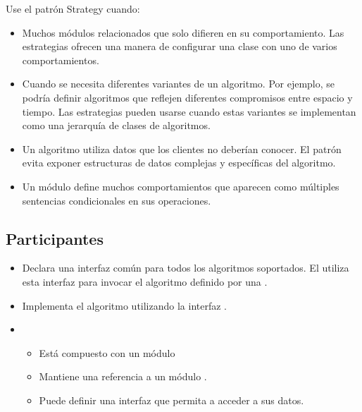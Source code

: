 Use el patrón Strategy cuando:

\begin{itemize}

\item Muchos módulos relacionados que solo difieren en su comportamiento. Las estrategias ofrecen una manera de configurar una clase con uno de varios comportamientos.

\item Cuando se necesita diferentes variantes de un algoritmo. Por ejemplo, se podría definir algoritmos que reflejen diferentes compromisos entre espacio y tiempo. Las estrategias pueden usarse cuando estas variantes se implementan como una jerarquía de clases de algoritmos.

\item Un algoritmo utiliza datos que los clientes no deberían conocer. El patrón evita exponer estructuras de datos complejas y específicas del algoritmo.

\item Un módulo define muchos comportamientos que aparecen como múltiples sentencias condicionales en sus operaciones.

\end{itemize}


\subsection*{Participantes}


\begin{itemize}
\item \Estrategia Declara una interfaz común para todos los algoritmos soportados. El \Contexto utiliza esta interfaz para invocar el algoritmo definido por una \EstrategiaConcreta.

\item \EstrategiaConcreta Implementa el algoritmo utilizando la interfaz \Estrategia.

\item  \Contexto \begin{itemize}
		\item Está compuesto con un módulo \EstrategiaConcreta
		\item Mantiene una referencia a un módulo \Estrategia.
		\item Puede definir una interfaz que permita a \Estrategia acceder a sus datos.

		\end{itemize}


\end{itemize}


